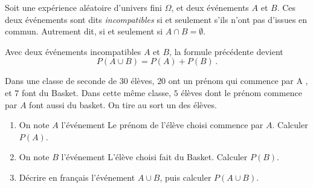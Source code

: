 \documentclass{article}
\begin{document}
\begin{remark}
\begin{center}
\end{center}
\end{remark}
\begin{definition}
Soit une expérience aléatoire d'univers fini $\Omega$, et deux événements $A$ et $B$. Ces deux événements sont dits \emph{incompatibles} si et seulement s'ils n'ont pas d'issues en commun. Autrement dit, si et seulement si $A \cap B = \emptyset$.
\end{definition}
\begin{proposition}
Avec deux événements incompatibles $A$ et $B$, la formule précédente devient
\begin{equation*}
P(A \cup B) = P(A) + P(B)\,.
\end{equation*}
\end{proposition}
\vspace*{0.5cm}
\begin{example}
Dans une classe de seconde de $30$ élèves, $20$ ont un prénom qui commence par \og A \fg, et $7$ font du Basket. Dans cette même classe, $5$ élèves dont le prénom commence par $A$ font aussi du basket. On tire au sort un des élèves.
\begin{enumerate}[label=\emph{\alph*)}]
\item On note $A$ l'événement \og Le prénom de l'élève choisi commence par $A$\fg. Calculer $P(A)$. 
\item On note $B$ l'événement \og L'élève choisi fait du Basket\fg. Calculer $P(B)$.
\item Décrire en français l'événement $A \cup B$, puis calculer $P(A \cup B)$.
\end{enumerate}
\emptybox{4cm}
\vspace*{0.5cm}
\end{example}
\end{document}
